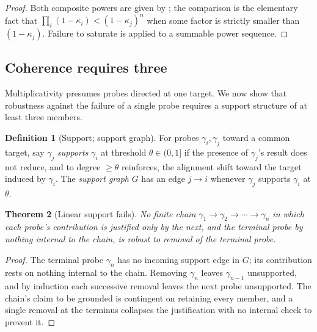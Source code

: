 \documentclass[11pt,twocolumn,a4paper]{article}
\theoremstyle{dirthm}
\newtheorem{theorem}{Theorem}[section]
\theoremstyle{definition}
\newtheorem{definition}[theorem]{Definition}
\theoremstyle{remark}
\newcommand{\pot}{\kappa}
\begin{document}
\begin{proof}
Both composite powers are given by ; the comparison
is the elementary fact that $\prod_i(1-\pot_i)<(1-\pot_j)^n$ when some factor
is strictly smaller than $(1-\pot_j)$. Failure to saturate is
 applied to a summable power sequence.
\end{proof}

\subsection{Coherence requires three}

Multiplicativity presumes probes directed at one target. We now show that
robustness against the failure of a single probe requires a support structure
of at least three members.

\begin{definition}[Support; support graph]
\label{def:support}
For probes $\gamma_i,\gamma_j$ toward a common target, say $\gamma_j$
\emph{supports} $\gamma_i$ at threshold $\theta\in(0,1]$ if the presence of
$\gamma_j$'s result does not reduce, and to degree $\ge\theta$ reinforces, the
alignment shift toward the target induced by $\gamma_i$. The \emph{support
graph} $G$ has an edge $j\to i$ whenever $\gamma_j$ supports $\gamma_i$ at
$\theta$.
\end{definition}

\begin{theorem}[Linear support fails]
\label{thm:linear-fails}
No finite chain $\gamma_1\to\gamma_2\to\cdots\to\gamma_n$ in which each
probe's contribution is justified only by the next, and the terminal probe by
nothing internal to the chain, is robust to removal of the terminal probe.
\end{theorem}

\begin{proof}
The terminal probe $\gamma_n$ has no incoming support edge in $G$; its
contribution rests on nothing internal to the chain. Removing $\gamma_n$
leaves $\gamma_{n-1}$ unsupported, and by induction each successive removal
leaves the next probe unsupported. The chain's claim to be grounded is
contingent on retaining every member, and a single removal at the terminus
collapses the justification with no internal check to prevent it.
\end{proof}
\end{document}
